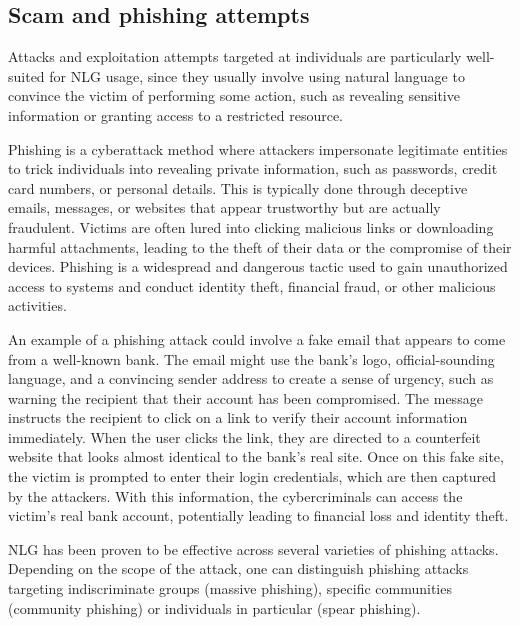 \subsection{Scam and phishing attempts}

Attacks and exploitation attempts targeted at individuals are particularly well-suited for NLG usage, since they usually involve using natural language to convince the victim of performing some action, such as revealing sensitive information or granting access to a restricted resource.

Phishing is a cyberattack method where attackers impersonate legitimate entities to trick individuals into revealing private information, such as passwords, credit card numbers, or personal details.
This is typically done through deceptive emails, messages, or websites that appear trustworthy but are actually fraudulent. Victims are often lured into clicking malicious links or downloading harmful attachments, leading to the theft of their data or the compromise of their devices.
Phishing is a widespread and dangerous tactic used to gain unauthorized access to systems and conduct identity theft, financial fraud, or other malicious activities.

An example of a phishing attack could involve a fake email that appears to come from a well-known bank. The email might use the bank's logo, official-sounding language, and a convincing sender address to create a sense of urgency, such as warning the recipient that their account has been compromised.
The message instructs the recipient to click on a link to verify their account information immediately. When the user clicks the link, they are directed to a counterfeit website that looks almost identical to the bank's real site.
Once on this fake site, the victim is prompted to enter their login credentials, which are then captured by the attackers.
With this information, the cybercriminals can access the victim's real bank account, potentially leading to financial loss and identity theft.

NLG has been proven to be effective across several varieties of phishing attacks. Depending on the scope of the attack, one can distinguish phishing attacks targeting indiscriminate groups (massive phishing), specific communities (community phishing) or individuals in particular (spear phishing).

